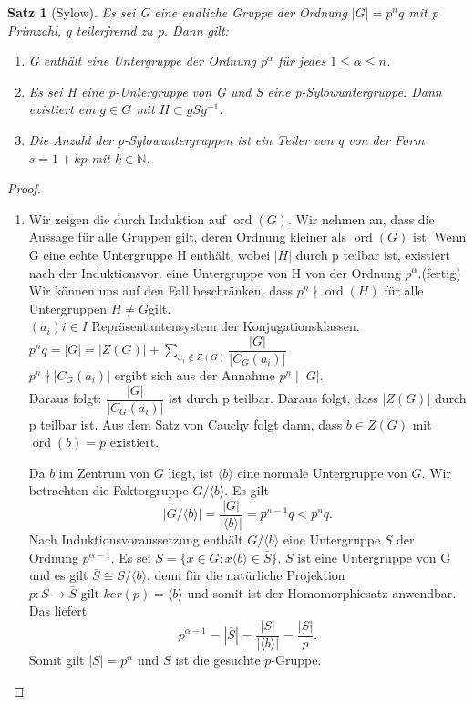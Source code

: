 \documentclass[12pt]{scrartcl}%
\newtheorem{thm}{Satz}
\theoremstyle{definition}
\theoremstyle{remark}
\DeclareMathOperator\ord{ord}
\begin{document}
\begin{thm} [Sylow]
Es sei G eine endliche Gruppe der Ordnung $|G|=p^n q$ mit p Primzahl, q teilerfremd zu p. Dann gilt:

\begin{enumerate}
\item G enthält eine Untergruppe der Ordnung $p^\alpha$ für jedes $1\leq \alpha \leq n$.
\item Es sei H eine p-Untergruppe von G und S eine p-Sylowuntergruppe. Dann existiert ein $g \in G$ mit $H \subset gSg^{-1}$.
\item Die Anzahl der p-Sylowuntergruppen ist ein Teiler von q von der Form $s=1+kp$ mit $k \in \mathbb{N}$.
\end{enumerate}
\end{thm}

\begin{proof}
\begin{enumerate}
\item Wir zeigen die durch Induktion auf $\ord(G)$.
Wir nehmen an, dass die Aussage für alle Gruppen gilt, deren Ordnung kleiner als \(\ord(G)\) ist.
Wenn G eine echte Untergruppe H enthält, wobei $|H|$ durch p teilbar ist, existiert nach der Induktionsvor. eine Untergruppe von H von der Ordnung $p^\alpha$.(fertig) \\
Wir können uns auf den Fall beschränken, dass $p^n \nmid \ord(H)$ für alle Untergruppen $H\neq G$gilt. \\
$(a_{i}){i \in I}$ Repräsentantensystem der Konjugationsklassen. \\
$p^n q=|G|=|Z(G)|+\sum_{x_{i}\notin Z(G)}\dfrac{|G|}{|C_{G}(a_{i})|}$ \\
$p^n \nmid |C_{G}(a_{i})|$ ergibt sich aus der Annahme $p^n \mid |G|$. \\
Daraus folgt: $\dfrac{|G|}{|C_{G}(a_{i})|}$ ist durch p teilbar. Daraus folgt, dass $|Z(G)|$ durch p teilbar ist. Aus dem Satz von Cauchy folgt dann, dass $b \in Z(G)$ mit $\ord(b)=p$ existiert.

Da $b$ im Zentrum von $G$ liegt, ist $\langle b \rangle$ eine normale Untergruppe von $G$. Wir betrachten die Faktorgruppe $G/ \langle b \rangle$. Es gilt
	$$ |G/ \langle b \rangle | = \frac{|G|}{| \langle b \rangle |} = p^{n-1}q < p^nq. $$
	Nach Induktionsvoraussetzung enthält $G / \langle b \rangle$ eine Untergruppe $\bar{S}$ der Ordnung $p^{\alpha - 1}$. Es sei $S = \{ x \in G : x \langle b \rangle \in \bar{S} \}$. $S$ ist eine Untergruppe von G und es gilt $ \bar{S} \cong S/ \langle b \rangle$, denn für die natürliche Projektion $p: S \rightarrow \bar{S} \text{ gilt } ker(p) = \langle b \rangle$ und somit ist der Homomorphiesatz anwendbar. Das liefert
	$$ p^{\alpha - 1} = |\bar{S}| = \frac{|S|}{| \langle b \rangle |} = \frac{|S|}{p}. $$
	Somit gilt $|S| = p^{\alpha}$ und $S$ ist die gesuchte $p$-Gruppe.
	

\end{enumerate}
\end{proof}
\end{document}
